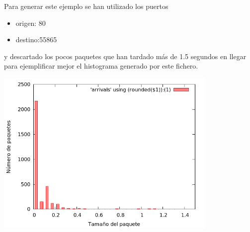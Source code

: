 \documentclass{apuntes}
\begin{document}
\begin{itemize}
	Para generar este ejemplo se han utilizado los puertos 
	\begin{itemize}
		\item origen: 80
		\item destino:55865
	\end{itemize}
	y descartado los pocos paquetes que han tardado más de 1.5 segundos en llegar para ejemplificar mejor el histograma generado por este fichero.
	\begin{center}
	\includegraphics[width=0.8\textwidth]{imgs/mem_arrivals_port.png}
	\end{center}
\end{itemize}
\end{document}
